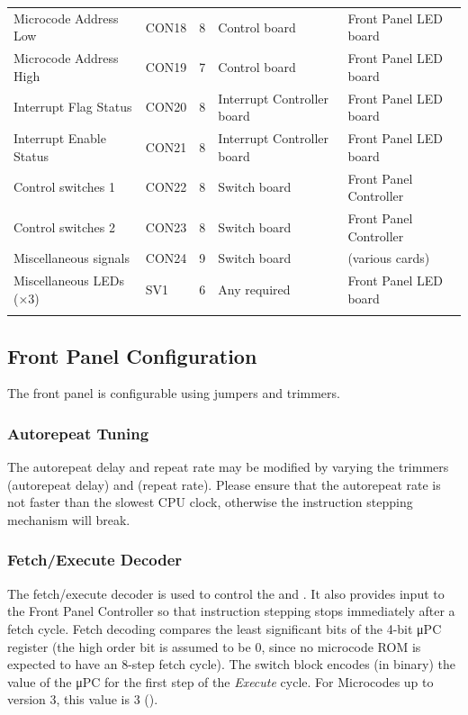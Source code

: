 \begin{table}[tb]
\begin{tabular}{llcll}
    Microcode Address Low    & CON18 & 8 & Control board & Front Panel LED board \\
    Microcode Address High   & CON19 & 7 & Control board & Front Panel LED board \\
    Interrupt Flag Status    & CON20 & 8 & Interrupt Controller board & Front Panel LED board \\
    Interrupt Enable Status  & CON21 & 8 & Interrupt Controller board & Front Panel LED board \\
    Control switches 1       & CON22 & 8 & Switch board & Front Panel Controller \\
    Control switches 2       & CON23 & 8 & Switch board & Front Panel Controller \\
    Miscellaneous signals    & CON24 & 9 & Switch board & (various cards) \\
    Miscellaneous LEDs (×3)  & SV1   & 6 & Any required & Front Panel LED board \\
    \noalign{\smallskip}\hline\noalign{\smallskip}
  \end{tabular}
\end{table}

\subsection{Front Panel Configuration}

The front panel is configurable using jumpers and trimmers.

\subsubsection{ Autorepeat Tuning}

The autorepeat delay and repeat rate may be modified by varying the
trimmers  (autorepeat delay) and  (repeat
rate). Please ensure that the autorepeat rate is not faster than the
slowest CPU clock, otherwise the instruction stepping mechanism will
break.

\subsubsection{Fetch/Execute Decoder}

The fetch/execute decoder is used to control the  and
. It also provides input to the Front Panel Controller so
that instruction stepping stops immediately after a fetch cycle. Fetch
decoding compares the least significant bits of the 4-bit μPC register
(the high order bit is assumed to be 0, since no microcode ROM is
expected to have an 8-step fetch cycle). The  switch block
 encodes (in binary) the value of the μPC for the first
step of the {\em Execute\/} cycle. For Microcodes up to version 3,
this value is 3 ().

